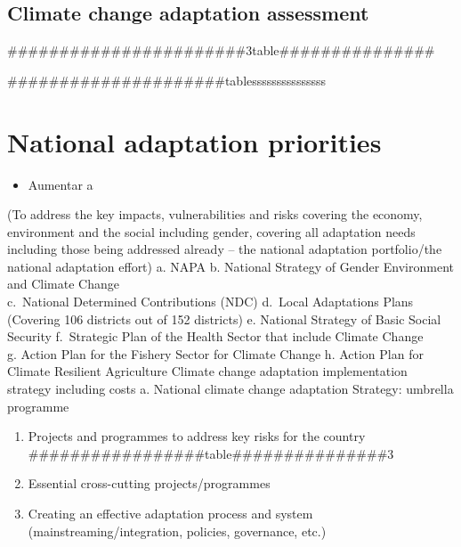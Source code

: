 \documentclass[
]{book}
\providecommand{\tightlist}{%
  \setlength{\itemsep}{0pt}\setlength{\parskip}{0pt}}
\begin{document}
\hypertarget{climate-change-adaptation-assessment}{%
\section{Climate change adaptation assessment}\label{climate-change-adaptation-assessment}}

\#\#\#\#\#\#\#\#\#\#\#\#\#\#\#\#\#\#\#\#\#\#\#3table\#\#\#\#\#\#\#\#\#\#\#\#\#\#\#

\#\#\#\#\#\#\#\#\#\#\#\#\#\#\#\#\#\#\#\#\#tablesssssssssssssss

\hypertarget{national-adaptation-priorities}{%
\chapter{National adaptation priorities}\label{national-adaptation-priorities}}

\begin{itemize}
\tightlist
\item
  Aumentar a
\end{itemize}

(To address the key impacts, vulnerabilities and risks covering the economy, environment and the social including gender, covering all adaptation needs including those being addressed already -- the national adaptation portfolio/the national adaptation effort)
a. NAPA
b. National Strategy of Gender Environment and Climate Change\\
c.~National Determined Contributions (NDC)
d.~Local Adaptations Plans (Covering 106 districts out of 152 districts)
e. National Strategy of Basic Social Security
f.~Strategic Plan of the Health Sector that include Climate Change\\
g. Action Plan for the Fishery Sector for Climate Change
h. Action Plan for Climate Resilient Agriculture
Climate change adaptation implementation strategy including costs
a. National climate change adaptation Strategy: umbrella programme

\begin{enumerate}
\def\labelenumi{\alph{enumi}.}
\setcounter{enumi}{1}
\item
  Projects and programmes to address key risks for the country
  \#\#\#\#\#\#\#\#\#\#\#\#\#\#\#\#\#table\#\#\#\#\#\#\#\#\#\#\#\#\#\#\#3
\item
  Essential cross-cutting projects/programmes
\item
  Creating an effective adaptation process and system (mainstreaming/integration, policies, governance, etc.)
\end{enumerate}
\end{document}
